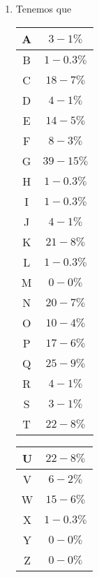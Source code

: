 \documentclass[letterpaper,11pt]{article}
\begin{document}
\begin{enumerate}
\begin{enumerate}
\begin{enumerate}
            \item Tenemos que 
            \begin{center}
                \begin{tabular}{|c|c|}
                \hline
                A & $3-1\%$ \\ \hline
                B & $1-0.3\%$ \\ \hline
                C & $18-7\%$ \\ \hline
                D & $4-1\%$ \\ \hline
                E & $14-5\%$ \\ \hline
                F & $8-3\%$ \\ \hline
                G & $39-15\%$ \\ \hline
                H & $1-0.3\%$ \\ \hline
                I & $1-0.3\%$ \\ \hline
                J & $4-1\%$ \\ \hline
                K & $21-8\%$ \\ \hline
                L & $1-0.3\%$ \\ \hline
                M & $0-0\%$ \\ \hline
                N & $20-7\%$ \\ \hline
                O & $10-4\%$ \\ \hline
                P & $17-6\%$\\ \hline
                Q & $25-9\%$ \\ \hline
                R & $4-1\%$ \\ \hline
                S & $3-1\%$ \\ \hline
                T & $22-8\%$ \\ \hline
                \end{tabular}
            \end{center}

            \begin{center}
                \begin{tabular}{|c|c|}
                    \hline
                    U & $22-8\%$ \\ \hline
                    V & $6-2\%$ \\ \hline
                    W & $15-6\%$ \\ \hline
                    X & $1-0.3\%$ \\ \hline
                    Y & $0-0\%$ \\ \hline
                    Z & $0-0\%$ \\ \hline
                \end{tabular}
            \end{center}


\end{enumerate}
\end{enumerate}
\end{enumerate}
\end{document}
